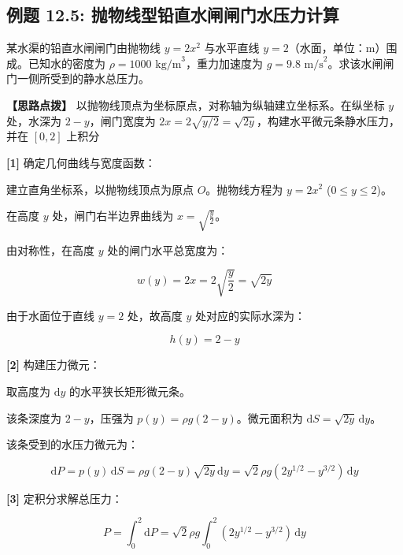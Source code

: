 \documentclass[11pt,a4paper,UTF8]{ctexart}
\begin{document}
\subsection{例题 12.5: 抛物线型铅直水闸闸门水压力计算}

某水渠的铅直水闸闸门由抛物线 $y = 2x^2$ 与水平直线 $y = 2$（水面，单位：$\text{m}$）围成。已知水的密度为 $\rho = 1000\text{ kg/m}^3$，重力加速度为 $g = 9.8\text{ m/s}^2$。求该水闸闸门一侧所受到的静水总压力。

\textbf{\color{DeepPurple}【思路点拨】} 以抛物线顶点为坐标原点，对称轴为纵轴建立坐标系。在纵坐标 $y$ 处，水深为 $2-y$，闸门宽度为 $2x = 2\sqrt{y/2} = \sqrt{2y}$，构建水平微元条静水压力，并在 $[0, 2]$ 上积分


\begin{solbox}[分步推导与答题规范]
\textbf{[1]} 确定几何曲线与宽度函数：

建立直角坐标系，以抛物线顶点为原点 $O$。抛物线方程为 $y = 2x^2$ ($0 \leqslant y \leqslant 2$)。

在高度 $y$ 处，闸门右半边界曲线为 $x = \sqrt{\frac{y}{2}}$。

由对称性，在高度 $y$ 处的闸门水平总宽度为：


\begin{equation*}
w(y) = 2x = 2\sqrt{\frac{y}{2}} = \sqrt{2y}
\end{equation*}


由于水面位于直线 $y = 2$ 处，故高度 $y$ 处对应的实际水深为：


\begin{equation*}
h(y) = 2 - y
\end{equation*}


\textbf{[2]} 构建压力微元：

取高度为 $\mathrm{d}y$ 的水平狭长矩形微元条。

该条深度为 $2-y$，压强为 $p(y) = \rho g(2 - y)$。微元面积为 $\mathrm{d}S = \sqrt{2y}\,\mathrm{d}y$。

该条受到的水压力微元为：


\begin{equation*}
\mathrm{d}P = p(y)\,\mathrm{d}S = \rho g (2 - y)\sqrt{2y}\,\mathrm{d}y = \sqrt{2}\rho g (2y^{1/2} - y^{3/2})\,\mathrm{d}y
\end{equation*}


\textbf{[3]} 定积分求解总压力：


\begin{equation*}
P = \int_0^2 \mathrm{d}P = \sqrt{2}\rho g \int_0^2 (2y^{1/2} - y^{3/2})\,\mathrm{d}y
\end{equation*}




\end{solbox}
\end{document}
